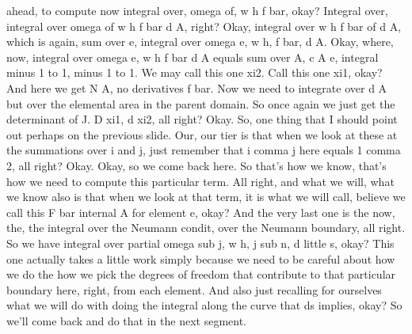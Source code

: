 \documentclass[10pt]{article}
\begin{document}
ahead, to compute now integral over, omega of, w h f bar, okay? Integral over, integral over omega of w h f bar d A, right? Okay, integral over w h f bar of d A, which is again, sum over e, integral over omega e, w h, f bar, d A. Okay, where, now, integral over omega e, w h f bar d A equals sum over A, c A e, integral minus 1 to 1, minus 1 to 1. We may call this one xi2. Call this one xi1, okay? And here we get N A, no derivatives f bar. Now we need to integrate over d A but over the elemental area in the parent domain. So once again we just get the determinant of J. D xi1, d xi2, all right? Okay. So, one thing that I should point out perhaps on the previous slide. Our, our tier is that when we look at these at the summations over i and j, just remember that i comma j here equals 1 comma 2, all right? Okay. Okay, so we come back here. So that's how we know, that's how we need to compute this particular term. All right, and what we will, what we know also is that when we look at that term, it is what we will call, believe we call this F bar internal A for element e, okay? And the very last one is the now, the, the integral over the Neumann condit, over the Neumann boundary, all right. So we have integral over partial omega sub j, w h, j sub n, d little s, okay? This one actually takes a little work simply because we need to be careful about how we do the how we pick the degrees of freedom that contribute to that particular boundary here, right, from each element. And also just recalling for ourselves what we will do with doing the integral along the curve that ds implies, okay? So we'll come back and do that in the next segment.
\end{document}
